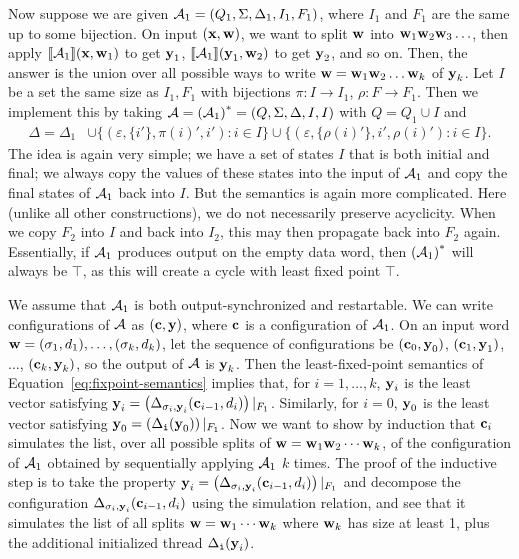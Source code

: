 Now suppose we are given $\mathcal{A}_1 = (Q_{1}, \Sigma, \Delta_{1}, I_{1}, F_{1})$, where $I_1$ and $F_1$ are the same up to some bijection. On input $(\textbf{x},\textbf{w})$, we want to split $\textbf{w}$ into $\textbf{w}_1 \textbf{w}_2 \textbf{w}_3 \ldots$, then apply $\llbracket \mathcal{A}_1 \rrbracket(\textbf{x},\textbf{w}_1)$ to get $\textbf{y}_1$, $\llbracket \mathcal{A}_1 \rrbracket(\textbf{y}_1,\textbf{w}_2)$ to get $\textbf{y}_2$, and so on. Then, the answer is the union over all possible ways to write $\textbf{w} = \textbf{w}_1 \textbf{w}_2 \ldots \textbf{w}_k$ of $\textbf{y}_k$. Let $I$ be a set the same size as $I_1, F_1$ with bijections $\pi: I \to I_1$, $\rho: F \to F_1$. Then we implement this by taking $\mathcal{A} = {{(\mathcal{A}_1)}^{*}} = (Q, \Sigma, \Delta, I, I)$ with $Q = Q_1 \cup I$ and
\begin{align*}
\Delta = \Delta_1
    &\cup \big\{(\varepsilon, \{i'\}, \pi(i)', i'): i \in I \big\}
    \cup \big\{(\varepsilon, \{\rho(i)'\}, i', \rho(i)'): i \in I \big\}.
\end{align*}
The idea is again very simple; we have a set of states $I$ that is both initial and final; we always copy the values of these states into the input of $\mathcal{A}_1$ and copy the final states of $\mathcal{A}_1$ back into $I$. But the semantics is again more complicated. Here (unlike all other constructions), we do not necessarily preserve acyclicity. When we copy $F_2$ into $I$ and back into $I_2$, this may then propagate back into $F_2$ again. Essentially, if $\mathcal{A}_1$ produces output on the empty data word, then ${{(\mathcal{A}_1)}^{*}}$ will always be $\top$, as this will create a cycle with least fixed point $\top$.

We assume that $\mathcal{A}_1$ is both output-synchronized and restartable. We can write configurations of $\mathcal{A}$ as $(\textbf{c}, \textbf{y})$, where $\textbf{c}$ is a configuration of $\mathcal{A}_1$.
On an input word $\textbf{w} = (\sigma_1,d_1),\ldots,(\sigma_k,d_k)$, let the sequence of configurations be $(\textbf{c}_0, \textbf{y}_0)$, $(\textbf{c}_1,\textbf{y}_1)$, $\ldots$, $(\textbf{c}_k, \textbf{y}_k)$, so the output of $\mathcal{A}$ is $\textbf{y}_k$.
Then the least-fixed-point semantics of Equation~\eqref{eq:fixpoint-semantics} implies that, for $i=1, \ldots, k$, $\textbf{y}_i$ is the least vector satisfying $\textbf{y}_i = \left(\Delta_{\sigma_i, \textbf{y}_i}(\textbf{c}_{i-1}, d_i)\right)|_{F_1}$. Similarly, for $i = 0$, $\textbf{y}_0$ is the least vector satisfying $\textbf{y}_0 = \left(\Delta_{\texttt{i}}(\textbf{y}_0)\right)|_{F_1}$. Now we want to show by induction that $\textbf{c}_i$ simulates the list, over all possible splits of $\textbf{w} = \textbf{w}_1 \textbf{w}_2 \cdots \textbf{w}_k$, of the configuration of $\mathcal{A}_1$ obtained by sequentially applying $\mathcal{A}_1$ $k$ times. The proof of the inductive step is to take the property $\textbf{y}_i = \left(\Delta_{\sigma_i, \textbf{y}_i}(\textbf{c}_{i-1}, d_i)\right)|_{F_1}$ and decompose the configuration $\Delta_{\sigma_i, \textbf{y}_i}(\textbf{c}_{i-1}, d_i)$ using the simulation relation, and see that it simulates the list of all splits $\textbf{w} = \textbf{w}_1 \cdots \textbf{w}_k$ where $\textbf{w}_k$ has size at least 1, plus the additional initialized thread $\Delta_{\texttt{i}}(\textbf{y}_i)$.

